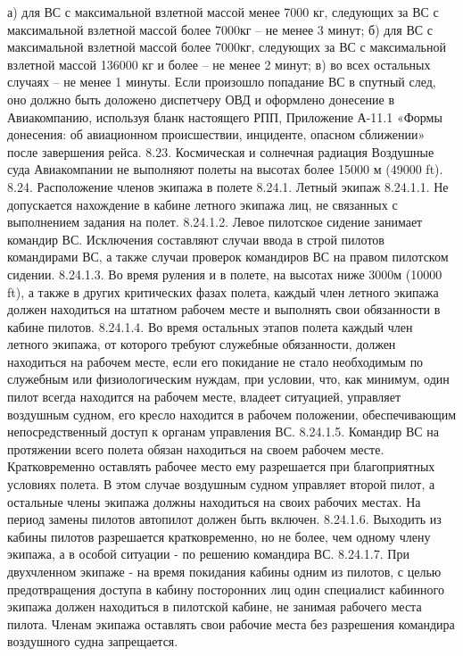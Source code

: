 а)	для ВС с максимальной взлетной массой менее 7000 кг, следующих за ВС с максимальной взлетной массой более 7000кг – не менее 3 минут; 
б)	для ВС с максимальной взлетной массой более 7000кг, следующих за ВС с максимальной взлетной массой 136000 кг и более – не менее 2 минут; 
в)	во всех остальных случаях – не менее 1 минуты.
Если произошло попадание ВС в спутный след, оно должно быть доложено диспетчеру ОВД и оформлено донесение в Авиакомпанию, используя бланк настоящего РПП, Приложение А-11.1 «Формы донесения: об авиационном происшествии, инциденте, опасном сближении» после завершения рейса. 
8.23. Космическая и солнечная радиация 
Воздушные суда Авиакомпании не выполняют полеты на высотах более 15000 м (49000 ft).
8.24. Расположение членов экипажа в полете
8.24.1. Летный экипаж
8.24.1.1. Не допускается нахождение в кабине летного экипажа лиц, не связанных с выполнением задания на полет.
8.24.1.2. Левое пилотское сидение занимает командир ВС. Исключения составляют случаи ввода в строй пилотов командирами ВС, а также случаи проверок командиров ВС на правом пилотском сидении.
8.24.1.3. Во время руления и в полете, на высотах ниже 3000м (10000 ft), а также в других критических фазах полета, каждый член летного экипажа должен находиться на штатном рабочем месте и выполнять свои обязанности в кабине пилотов.
8.24.1.4. Во время остальных этапов полета каждый член летного экипажа, от которого требуют служебные обязанности, должен находиться на рабочем месте, если его покидание не стало необходимым по служебным или физиологическим нуждам, при условии, что, как минимум, один пилот всегда находится на рабочем месте, владеет ситуацией, управляет воздушным судном, его кресло находится в рабочем положении, обеспечивающим непосредственный доступ к органам управления ВС.
8.24.1.5. Командир ВС на протяжении всего полета обязан находиться на своем рабочем месте.  Кратковременно оставлять рабочее место ему разрешается при благоприятных условиях полета. В этом случае воздушным судном управляет второй пилот, а остальные члены экипажа должны находиться на своих рабочих местах. На период замены пилотов автопилот должен быть включен.
8.24.1.6. Выходить из кабины пилотов разрешается кратковременно, но не более, чем одному члену экипажа, а в особой ситуации - по решению командира ВС.
8.24.1.7. При двухчленном экипаже - на время покидания кабины одним из пилотов, с целью предотвращения доступа в кабину посторонних лиц один специалист кабинного экипажа должен находиться в пилотской кабине, не занимая рабочего места пилота.
Членам экипажа оставлять свои рабочие места без разрешения командира воздушного судна запрещается.
